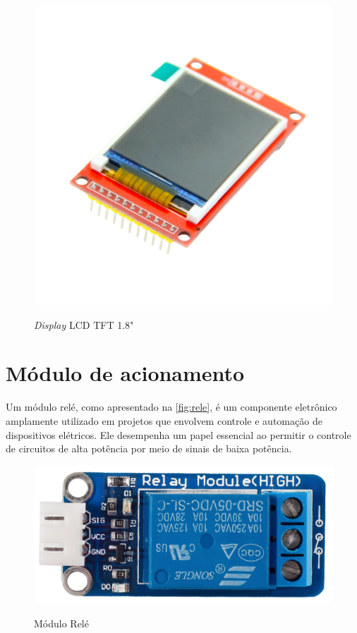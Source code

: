 \begin{figure}[h!]
    \centering
    \caption{\textit{Display} LCD TFT 1.8"}
    \includegraphics[scale=0.4]{figuras/tftst7735.png}
    \label{fig:tft7735}
    \centering
\end{figure}

\section{Módulo de acionamento}\label{sec:acionamento}

Um módulo relé, como apresentado na \autoref{fig:rele}, é um componente 
eletrônico amplamente utilizado em projetos que envolvem controle 
e automação de dispositivos elétricos. Ele desempenha 
um papel essencial ao permitir o controle de circuitos 
de alta potência por meio de sinais de baixa potência.

\begin{figure}[h!]
    \centering
    \caption{Módulo Relé}
    \includegraphics[scale=0.8]{figuras/rele.png}
    \label{fig:rele}
    \centering
\end{figure}

